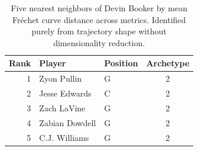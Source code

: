 \begin{table}[htbp]
  \centering\small
  \begin{tabular}{rllc}
    \toprule
    Rank & Player & Position & Archetype \\
    \midrule
    1 & Zyon Pullin & G & 2 \\
    2 & Jesse Edwards & C & 2 \\
    3 & Zach LaVine & G & 2 \\
    4 & Zabian Dowdell & G & 2 \\
    5 & C.J. Williams & G & 2 \\
    \bottomrule
  \end{tabular}
  \caption{Five nearest neighbors of Devin Booker by mean Fr\'{e}chet curve distance across metrics. Identified purely from trajectory shape without dimensionality reduction.}
  \label{tab:Devin_Booker_frechet_curve_neighbors}
\end{table}

